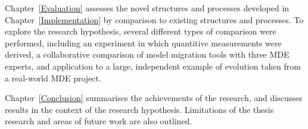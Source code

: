 Chapter~\ref{Evaluation} assesses the novel structures and processes developed in Chapter~\ref{Implementation} by comparison to existing structures and processes. To explore the research hypothesis, several different types of comparison were performed, including an experiment in which quantitive measurements were derived, a collaborative comparison of model migration tools with three MDE experts, and application to a large, independent example of evolution taken from a real-world MDE project.

Chapter~\ref{Conclusion} summarises the achievements of the research, and discusses results in the context of the research hypothesis. Limitations of the thesis research and areas of future work are also outlined.